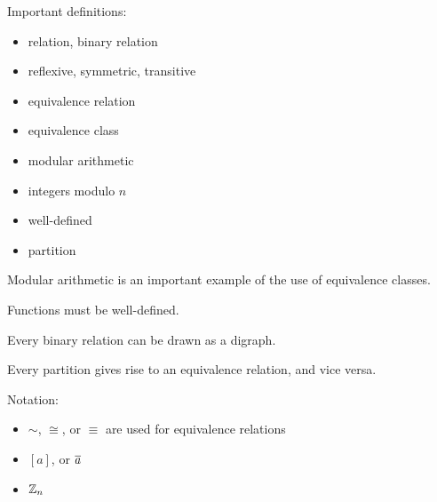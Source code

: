 


\begin{summary}
\item Important definitions:
\begin{itemize}
\item relation, binary relation
\item reflexive, symmetric, transitive
\item equivalence relation
\item equivalence class
\item modular arithmetic
\item integers modulo $n$
\item well-defined
\item partition
\end{itemize}
\item Modular arithmetic is an important example of the use of equivalence classes.
\item Functions must be well-defined.
\item Every binary relation can be drawn as a digraph.
\item Every partition gives rise to an equivalence relation, and vice versa.
\item Notation:
\begin{itemize}
\item $\sim$, $\cong$, or $\equiv$ are used for equivalence relations
\item $[a]$, or $\overline{a}$
\item $\mathbb{Z}_n$
\end{itemize}
\end{summary}